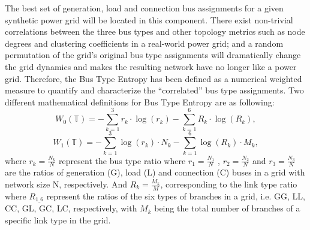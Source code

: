 \documentclass[12pt]{article}
\numberwithin{equation}{section}
\numberwithin{table}{section}
\numberwithin{figure}{section}
\begin{document}
The best set of generation, load and connection bus assignments for a given synthetic power grid will be located in this component. There exist non-trivial correlations between the three bus types and other topology metrics such as node degrees and clustering coefficients in a real-world power grid; and a random permutation of the grid's original bus type assignments will dramatically change the grid dynamics and makes the resulting network have no longer like a power grid. Therefore, the Bus Type Entropy has been defined as a numerical weighted measure to quantify and characterize the ``correlated'' bus type assignments. Two different mathematical definitions for Bus Type Entropy are as following:
\begin{equation}
	W_0(\mathbb{T}) = - \sum^3_{k=1}r_k \cdot \log(r_k) -\sum^6_{k=1}R_k \cdot \log(R_k),
\end{equation}
\begin{equation}
	W_1(\mathbb{T}) = - \sum^3_{k=1}\log(r_k) \cdot N_k -\sum^6_{k=1}\log(R_k) \cdot M_k, \end{equation}
where $r_k=\frac{N_k}{N}$ represent the bus type ratio where $r_1= \frac{N_1}{N}$ , $r_2=\frac{N_2}{N}$ and $r_3=\frac{N_3}{N}$ are the ratios of generation (G), load (L) and connection (C) buses in a grid with network size N, respectively. And $R_k=\frac{M_k}{M}$, corresponding to the link type ratio where $R_{1\_6}$ represent the ratios of the six types of branches in a grid, i.e. GG, LL, CC, GL, GC, LC, respectively, with $M_k$ being the total number of branches of a specific link type in the grid.
\end{document}
